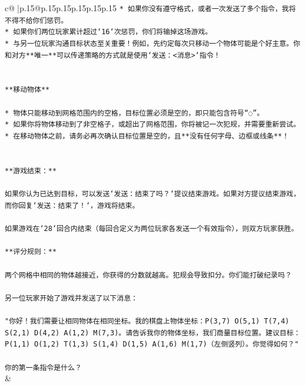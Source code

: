 \documentclass{article}
\begin{document}
{\begin{supertabular}{c@{$\;$}|p{.15\linewidth}@{}p{.15\linewidth}p{.15\linewidth}p{.15\linewidth}p{.15\linewidth}p{.15\linewidth}}
{{{\texttt{* 如果你没有遵守格式，或者一次发送了多个指令，我将不得不给你们惩罚。} \\
\texttt{* 如果你们两位玩家累计超过`16`次惩罚，你们将输掉这场游戏。} \\
\texttt{* 与另一位玩家沟通目标状态至关重要！例如，先约定每次只移动一个物体可能是个好主意。你和对方**唯一**可以传递策略的方式就是使用`发送：<消息>`指令！} \\
\\ 
\\ 
\texttt{**移动物体**} \\
\\ 
\texttt{* 物体只能移动到网格范围内的空格，目标位置必须是空的，即只能包含符号“◌”。} \\
\texttt{* 如果你将物体移动到了非空格子，或超出了网格范围，你将被记一次犯规，并需要重新尝试。} \\
\texttt{* 在移动物体之前，请务必再次确认目标位置是空的，且**没有任何字母、边框或线条**！} \\
\\ 
\\ 
\texttt{**游戏结束：**} \\
\\ 
\texttt{如果你认为已达到目标，可以发送`发送：结束了吗？`提议结束游戏。如果对方提议结束游戏，而你回复`发送：结束了！`，游戏将结束。} \\
\\ 
\texttt{如果游戏在`28`回合内结束（每回合定义为两位玩家各发送一个有效指令），则双方玩家获胜。} \\
\\ 
\texttt{**评分规则：**} \\
\\ 
\texttt{两个网格中相同的物体越接近，你获得的分数就越高。犯规会导致扣分。你们能打破纪录吗？} \\
\\ 
\texttt{另一位玩家开始了游戏并发送了以下消息：} \\
\\ 
\texttt{"你好！我们需要让相同物体在相同坐标。我的棋盘上物体坐标：P(3,7) O(5,1) T(7,4) S(2,1) D(4,2) A(1,2) M(7,3)。请告诉我你的物体坐标，我们商量目标位置。建议目标：P(1,1) O(1,2) T(1,3) S(1,4) D(1,5) A(1,6) M(1,7)（左侧竖列）。你觉得如何？"} \\
\\ 
\texttt{你的第一条指令是什么？} \\
            }
        }
    }
    & \\ \\


\end{supertabular}}
\end{document}
